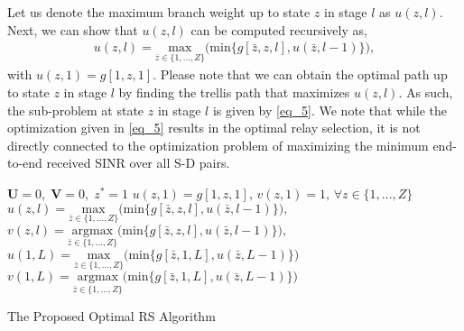 \documentclass[12pt,draftclsnofoot,onecolumn]{IEEEtran}
\begin{document}
	Let us denote the maximum branch weight up to state $z$ in stage $l$ as $u(z,l)$. Next, we can show that $u(z,l)$ can be computed recursively as,
	\begin{align}\label{eq_5}
		u(z,l)={\underset{\bar{z} \in \{1,...,Z\}} {\textrm{max}}}\biggl(\textrm{min}\biggl\{g[\bar{z},z,l], u(\bar{z},l-1)\biggr\}\biggr),
	\end{align}
	with $u(z,1)=g[1,z,1]$. Please note that we can obtain the optimal path up to state $z$ in stage $l$ by finding the trellis path that maximizes $u(z,l)$. As such, the sub-problem at state $z$ in stage $l$ is given by \eqref{eq_5}. We note that while the optimization given in \eqref{eq_5} results in the optimal relay selection, it is not directly connected to the optimization problem of maximizing the minimum end-to-end received SINR over all S-D pairs.
	\begin{algorithm}
		\DontPrintSemicolon 
		\SetAlgoLined
		
		$\mathbf{U}=0,\; \mathbf{V}=0,\; z^*=1$\;
		$u(z,1) = g[1,z,1],\, v(z,1) = 1, \, \forall z\in\{1,...,Z\}$ \;
		$u(z,l) \!=\! {\underset{\bar{z} \in \{1,...,Z\}} {\textrm{max}}}\biggl(\!\textrm{min}\biggl\{g[\bar{z},z,l], u(\bar{z},l-1)\biggr\}\biggr), $\;
		$v(z,l) \!=\! {\underset{\bar{z} \in \{1,...,Z\}} {\textrm{argmax}}}\biggl(\!\textrm{min}\biggl\{g[\bar{z},z,l], u(\bar{z},l-1)\biggr\}\biggr),$ 
		\;
		$u(1,L) = {\underset{\bar{z} \in \{1,...,Z\}} {\textrm{max}}}\biggl(\textrm{min}\biggl\{g[\bar{z},1,L], u(\bar{z},L-1)\biggr\}\biggr)$\;
		$v(1,L) = {\underset{\bar{z} \in \{1,...,Z\}} {\textrm{argmax}}}\biggl(\textrm{min}\biggl\{g[\bar{z},1,L], u(\bar{z},L-1)\biggr\}\biggr)$\;
		\caption{The Proposed Optimal RS Algorithm}
		\label{Algorithm_1}
	\end{algorithm}
	
\end{document}
